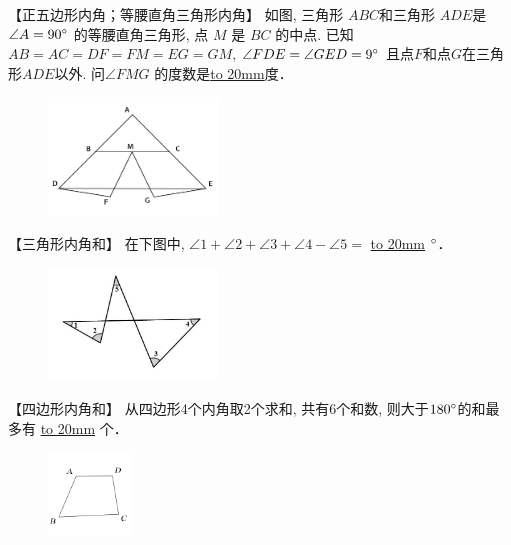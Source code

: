 \item {
    【正五边形内角；等腰直角三角形内角】
    如图, 三角形 $ABC$和三角形 $ADE$是 $\angle A=90\degree$ 的等腰直角三角形, 点 $M$ 是 $BC$ 的中点. 已知$AB=AC=DF=FM=EG=GM$, $\angle FDE = \angle GED=9\degree$ 且点$F$和点$G$在三角形$ADE$以外. 问$\angle FMG$ 的度数是\underline{\hbox to 20mm{}}度． 
    \begin{figure}[H] 
        \centering
        \includegraphics[width=0.4\textwidth]{./pics/Chapter_2/8.png}
    \end{figure}
    \vspace{1cm}
}

\item {
    【三角形内角和】
    {在下图中, $\angle 1 + \angle 2 + \angle 3 + \angle 4 - \angle 5=$ \underline{\hbox to 20mm{}} $\degree$．} 
    \begin{figure}[H] 
        \centering
        \includegraphics[width=0.4\textwidth]{./pics/Chapter_2/9.png}
    \end{figure}
    \vspace{1cm}
}

\item {
    【四边形内角和】
    从四边形4个内角取2个求和, 共有6个和数, 则大于$180\degree$的和最多有 \underline{\hbox to 20mm{}} 个．
    \begin{figure}[H] 
        \centering
        \includegraphics[width=0.2\textwidth]{./pics/Chapter_2/11.png}
    \end{figure}
    \vspace{1cm}
}
